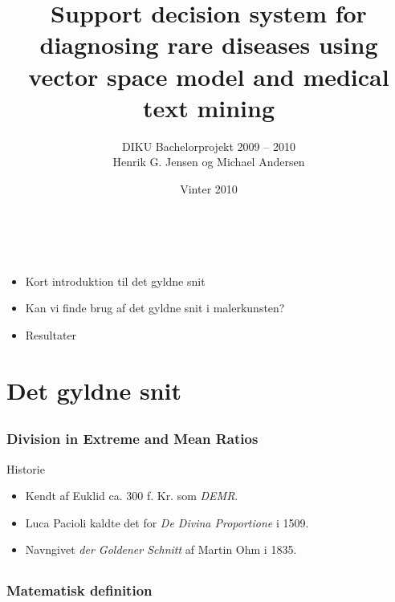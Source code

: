 \documentclass[xcolor=table]{beamer}
\title{Support decision system for diagnosing rare diseases using vector space model and medical text mining}
\subtitle{DIKU Bachelorprojekt 2009 -- 2010\\{\tiny Henrik G. Jensen og Michael Andersen}}
\date{Vinter 2010}
\begin{document}
\begin{frame}
    \titlepage
\end{frame}

\section[Oversigt]{}
\begin{frame}

    \frametitle{\ }

    \begin{itemize}
        \item Kort introduktion til det gyldne snit
        \item Kan vi finde brug af det gyldne snit i malerkunsten?
        \item Resultater
    \end{itemize}

\end{frame}

\section{Det gyldne snit}
\subsection*{}

\begin{frame}

    \frametitle{Division in Extreme and Mean Ratios}

    \begin{block}{Historie}

        \begin{itemize}
            \item Kendt af Euklid ca. 300 f. Kr. som \emph{DEMR}.
            \item Luca Pacioli kaldte det for \emph{De Divina Proportione} i 1509.
            \item Navngivet \emph{der Goldener Schnitt} af Martin Ohm i 1835.
        \end{itemize}

    \end{block}

\end{frame}


\subsection*{}
\begin{frame}

    \frametitle{Matematisk definition}


\end{frame}
\end{document}
